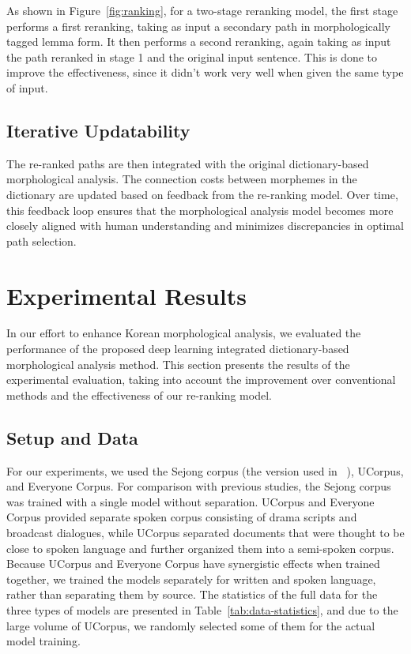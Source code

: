\documentclass[AMS,STIX2COL]{WileyNJD-v2}
\begin{document}
    As shown in Figure~\ref{fig:ranking}, for a two-stage reranking model, the first stage performs a first reranking, taking as input a secondary path in morphologically tagged lemma form. It then performs a second reranking, again taking as input the path reranked in stage 1 and the original input sentence. This is done to improve the effectiveness, since it didn't work very well when given the same type of input.

    \subsection{Iterative Updatability}\label{subsec4.5}

    The re-ranked paths are then integrated with the original dictionary-based morphological analysis. The connection costs between morphemes in the dictionary are updated based on feedback from the re-ranking model. Over time, this feedback loop ensures that the morphological analysis model becomes more closely aligned with human understanding and minimizes discrepancies in optimal path selection.


    \section{Experimental Results}\label{sec:results}

    In our effort to enhance Korean morphological analysis, we evaluated the performance of the proposed deep learning integrated dictionary-based morphological analysis method. This section presents the results of the experimental evaluation, taking into account the improvement over conventional methods and the effectiveness of our re-ranking model.

    \subsection{Setup and Data}\label{subsec5.1}

    For our experiments, we used the Sejong corpus (the version used in ~\cite{NaSH2014, NaSH2015, NaSH2018, SongHJ2019, SongHJ2020}), UCorpus\cite{UCorpusHG}, and Everyone Corpus\cite{EveryoneCorpus}. For comparison with previous studies, the Sejong corpus was trained with a single model without separation. UCorpus and Everyone Corpus provided separate spoken corpus consisting of drama scripts and broadcast dialogues, while UCorpus separated documents that were thought to be close to spoken language and further organized them into a semi-spoken corpus. Because UCorpus and Everyone Corpus have synergistic effects when trained together, we trained the models separately for written and spoken language, rather than separating them by source. The statistics of the full data for the three types of models are presented in Table~\ref{tab:data-statistics}, and due to the large volume of UCorpus, we randomly selected some of them for the actual model training.
\end{document}
